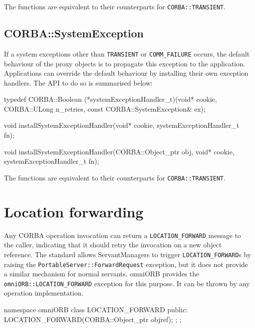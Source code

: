 \documentclass[11pt,twoside,a4paper]{book}
\newcommand{\code}[1]{\texttt{#1}}
\newcommand{\dsc}{\discretionary{}{}{}}
\begin{document}
The functions are equivalent to their counterparts for
\code{CORBA::TRANSIENT}.


\subsection{CORBA::SystemException}

If a system exceptions other than \code{TRANSIENT} or
\code{COMM\_FAILURE} occurs, the default behaviour of the proxy
objects is to propagate this exception to the application.
Applications can override the default behaviour by installing their
own exception handlers. The API to do so is summarised below:


\begin{cxxlisting}
typedef CORBA::Boolean
(*systemExceptionHandler_t)(void* cookie,
                            CORBA::ULong n_retries,
                            const CORBA::SystemException& ex);

void
installSystemExceptionHandler(void* cookie,
                              systemExceptionHandler_t fn);

void
installSystemExceptionHandler(CORBA::Object_ptr obj,
                              void* cookie,
                              systemExceptionHandler_t fn);
\end{cxxlisting}

The functions are equivalent to their counterparts for
\code{CORBA::TRANSIENT}.



\section{Location forwarding}
\label{sec:locationForward}

Any CORBA operation invocation can return a \code{LOCATION\_FORWARD}
message to the caller, indicating that it should retry the invocation
on a new object reference. The standard allows ServantManagers to
trigger \code{LOCATION\_FORWARD}s by raising the
\code{PortableServer::ForwardRequest} exception, but it does not
provide a similar mechanism for normal servants. omniORB provides the
\code{omniORB::\dsc{}LOCATION\_FORWARD} exception for this purpose. It
can be thrown by any operation implementation.

\begin{cxxlisting}
namespace omniORB {
  class LOCATION_FORWARD {
  public:
    LOCATION_FORWARD(CORBA::Object_ptr objref);
  };
};
\end{cxxlisting}
\end{document}

